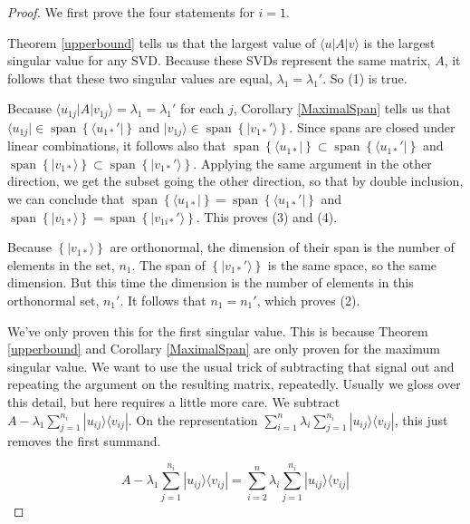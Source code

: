 \documentclass{amsbook}
\begin{document}
\begin{proof}

We first prove the four statements for $i=1$.

Theorem \ref{upperbound} tells us that the largest value of $\langle u|A|v\rangle$ is the largest singular value for any SVD.  Because these SVDs represent the same matrix, $A$, it follows that these two singular values are equal, $\lambda_1=\lambda_1'$.  So (1) is true.

Because $\langle u_{1j}|A|v_{1j}\rangle=\lambda_1=\lambda_1'$ for each $j$, Corollary \ref{MaximalSpan} tells us that $\langle u_{1j}|\in\operatorname{span}\left\{\langle u_{1*}'|\right\}$ and $|v_{1j}\rangle\in\operatorname{span}\left\{|v_{1*}'\rangle\right\}$.  Since spans are closed under linear combinations, it follows also that $\operatorname{span}\left\{\langle u_{1*}|\right\}\subset\operatorname{span}\left\{\langle u_{1*}'|\right\}$ and $\operatorname{span}\left\{|v_{1*}\rangle\right\}\subset\operatorname{span}\left\{|v_{1*}'\rangle\right\}$.  Applying the same argument in the other direction, we get the subset going the other direction, so that by double inclusion, we can conclude that $\operatorname{span}\left\{\langle u_{1*}|\right\}=\operatorname{span}\left\{\langle u_{1*}'|\right\}$ and $\operatorname{span}\left\{|v_{1*}\rangle\right\}=\operatorname{span}\left\{|v_{1i*}'\rangle\right\}$.  This proves (3) and (4).

Because $\left\{|v_{1*}\rangle\right\}$ are orthonormal, the dimension of their span is the number of elements in the set, $n_1$.  The span of $\left\{|v_{1*}'\rangle\right\}$ is the same space, so the same dimension.  But this time the dimension is the number of elements in this orthonormal set, $n_1'$.  It follows that $n_1=n_1'$, which proves (2).

We've only proven this for the first singular value.  This is because Theorem \ref{upperbound} and Corollary \ref{MaximalSpan} are only proven for the maximum singular value.  We want to use the usual trick of subtracting that signal out and repeating the argument on the resulting matrix, repeatedly.  Usually we gloss over this detail, but here requires a little more care.  We subtract $A-\lambda_1\sum_{j=1}^{n_i}|u_{ij}\rangle\langle v_{ij}|$.  On the representation $\sum_{i=1}^n\lambda_i\sum_{j=1}^{n_i}|u_{ij}\rangle\langle v_{ij}|$, this just removes the first summand.

$$
A-\lambda_1\sum_{j=1}^{n_i}|u_{ij}\rangle\langle v_{ij}|=\sum_{i=2}^n\lambda_i\sum_{j=1}^{n_i}|u_{ij}\rangle\langle v_{ij}|
$$


\end{proof}
\end{document}
